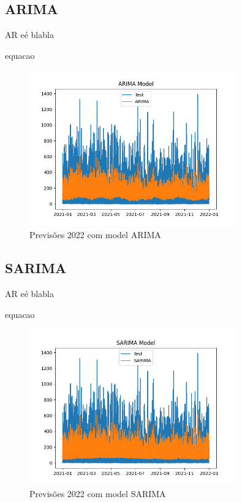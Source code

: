 \subsection{ARIMA}

AR eé blabla

equacao

\begin{figure}[H]
    \centering
    \includegraphics[width=0.8\textwidth]{../plots/ARIMA_model.png}
    \caption{Previsões 2022 com model ARIMA}
    \label{fig:ARIMA_model}
\end{figure}

\subsection{SARIMA}

AR eé blabla

equacao


\begin{figure}[H]
    \centering
    \includegraphics[width=0.8\textwidth]{../plots/SARIMA_model.png}
    \caption{Previsões 2022 com model SARIMA}
    \label{fig:SARIMA_model}
\end{figure}


